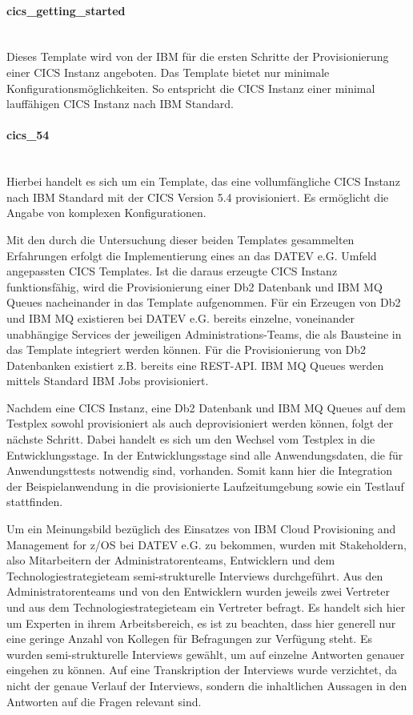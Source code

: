 \paragraph{\glqq cics\_getting\_started\grqq}~\\
Dieses Template wird von der IBM für die ersten Schritte der Provisionierung einer CICS Instanz angeboten.
Das Template bietet nur minimale Konfigurationsmöglichkeiten.
So entspricht die CICS Instanz einer minimal lauffähigen CICS Instanz nach IBM Standard.

\paragraph{\glqq cics\_54\grqq}~\\
Hierbei handelt es sich um ein Template, das eine vollumfängliche CICS Instanz nach IBM Standard mit der CICS Version 5.4 provisioniert.
Es ermöglicht die Angabe von komplexen Konfigurationen.

Mit den durch die Untersuchung dieser beiden Templates gesammelten Erfahrungen erfolgt die Implementierung eines an das DATEV e.G. Umfeld angepassten CICS Templates.
Ist die daraus erzeugte CICS Instanz funktionsfähig, wird die Provisionierung einer Db2 Datenbank und IBM MQ Queues nacheinander in das Template aufgenommen. 
Für ein Erzeugen von Db2 und IBM MQ existieren bei DATEV e.G. bereits einzelne, voneinander unabhängige Services der jeweiligen Administrations-Teams, die als Bausteine in das Template integriert werden können.
Für die Provisionierung von Db2 Datenbanken existiert z.B. bereits eine REST-API. 
IBM MQ Queues werden mittels Standard IBM Jobs provisioniert.

Nachdem eine CICS Instanz, eine Db2 Datenbank und IBM MQ Queues auf dem Testplex sowohl provisioniert als auch deprovisioniert werden können, folgt der nächste Schritt.
Dabei handelt es sich um den Wechsel vom Testplex in die Entwicklungsstage.
In der Entwicklungsstage sind alle Anwendungsdaten, die für Anwendungsttests notwendig sind, vorhanden.
Somit kann hier die Integration der Beispielanwendung in die provisionierte Laufzeitumgebung sowie ein Testlauf stattfinden.

Um ein Meinungsbild bezüglich des Einsatzes von \glqq IBM Cloud Provisioning and Management for z/OS\grqq{} bei DATEV e.G. zu bekommen, wurden mit Stakeholdern, also Mitarbeitern der Administratorenteams, Entwicklern und dem Technologiestrategieteam semi-strukturelle Interviews durchgeführt.
Aus den Administratorenteams und von den Entwicklern wurden jeweils zwei Vertreter und aus dem Technologiestrategieteam ein Vertreter befragt.
Es handelt sich hier um Experten in ihrem Arbeitsbereich, es ist zu beachten, dass hier generell nur eine geringe Anzahl von Kollegen für Befragungen zur Verfügung steht.
Es wurden semi-strukturelle Interviews gewählt, um auf einzelne Antworten genauer eingehen zu können.
Auf eine Transkription der Interviews wurde verzichtet, da nicht der genaue Verlauf der Interviews, sondern die inhaltlichen Aussagen in den Antworten auf die Fragen relevant sind.

